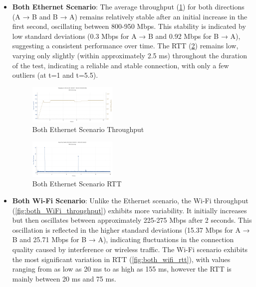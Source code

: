 \begin{itemize}
    \item \textbf{Both Ethernet Scenario}:
        The average throughput (\ref{fig:both_eth_throughput}) for both directions (A → B and B → A) remains relatively stable after an initial increase in the first second, oscillating between 800-950 Mbps. This stability is indicated by low standard deviations (0.3 Mbps for A → B and 0.92 Mbps for B → A), suggesting a consistent performance over time. The RTT (\ref{fig:both_eth_rtt}) remains low, varying only slightly (within approximately 2.5 ms) throughout the duration of the test, indicating a reliable and stable connection, with only a few outliers (at t=1 and t=5.5).
\vspace{-20pt}
    \begin{figure}[H]
        \centering
        \includegraphics[width=0.4\textwidth]{images/both_eth_throughput.pdf}
        \caption{Both Ethernet Scenario Throughput}
        \label{fig:both_eth_throughput}
    \end{figure}

    \begin{figure}[H]
        \centering
        \includegraphics[width=0.4\textwidth]{images/both_eth_rtt.pdf}
        \caption{Both Ethernet Scenario RTT}
        \label{fig:both_eth_rtt}
    \end{figure}

    \item \textbf{Both Wi-Fi Scenario}:
        Unlike the Ethernet scenario, the Wi-Fi throughput (\ref{fig:both_WiFi_throughput}) exhibits more variability. It initially increases but then oscillates between approximately 225-275 Mbps after 2 seconds. This oscillation is reflected in the higher standard deviations (15.37 Mbps for A → B and 25.71 Mbps for B → A), indicating fluctuations in the connection quality caused by interference or wireless traffic. The Wi-Fi scenario exhibits the most significant variation in RTT (\ref{fig:both_wifi_rtt}), with values ranging from as low as 20 ms to as high as 155 ms, however the RTT is mainly between 20 ms and 75 ms.
        

\end{itemize}
